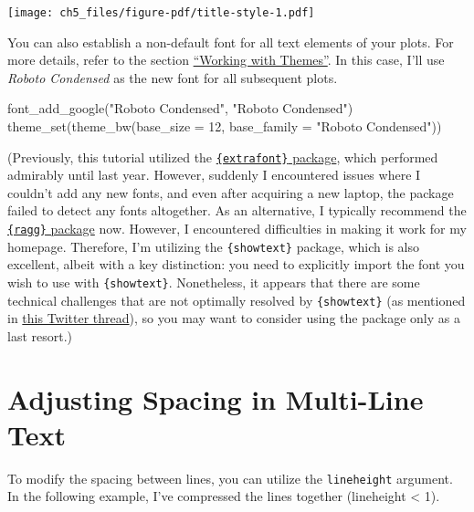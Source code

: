 \documentclass[
  letterpaper,
]{scrbook}
\newenvironment{Shaded}{\begin{snugshade}}{\end{snugshade}}
\newcommand{\AttributeTok}[1]{\textcolor[rgb]{0.40,0.45,0.13}{#1}}
\newcommand{\DecValTok}[1]{\textcolor[rgb]{0.68,0.00,0.00}{#1}}
\newcommand{\FunctionTok}[1]{\textcolor[rgb]{0.28,0.35,0.67}{#1}}
\newcommand{\NormalTok}[1]{\textcolor[rgb]{0.00,0.23,0.31}{#1}}
\newcommand{\StringTok}[1]{\textcolor[rgb]{0.13,0.47,0.30}{#1}}
\begin{document}
\texttt{[image: ch5\_files/figure-pdf/title-style-1.pdf]}

You can also establish a non-default font for all text elements of your
plots. For more details, refer to the section
\hyperref[themes]{``Working with Themes''}. In this case, I'll use
\emph{Roboto Condensed} as the new font for all subsequent plots.

\begin{Shaded}
\begin{Highlighting}[]
\FunctionTok{font\_add\_google}\NormalTok{(}\StringTok{"Roboto Condensed"}\NormalTok{, }\StringTok{"Roboto Condensed"}\NormalTok{)}
\FunctionTok{theme\_set}\NormalTok{(}\FunctionTok{theme\_bw}\NormalTok{(}\AttributeTok{base\_size =} \DecValTok{12}\NormalTok{, }\AttributeTok{base\_family =} \StringTok{"Roboto Condensed"}\NormalTok{))}
\end{Highlighting}
\end{Shaded}

(Previously, this tutorial utilized the
\href{https://cran.r-project.org/web/packages/extrafont/README.html}{\texttt{\{extrafont\}}
package}, which performed admirably until last year. However, suddenly I
encountered issues where I couldn't add any new fonts, and even after
acquiring a new laptop, the package failed to detect any fonts
altogether. As an alternative, I typically recommend the
\href{https://ragg.r-lib.org/}{\texttt{\{ragg\}} package} now. However,
I encountered difficulties in making it work for my homepage. Therefore,
I'm utilizing the \texttt{\{showtext\}} package, which is also
excellent, albeit with a key distinction: you need to explicitly import
the font you wish to use with \texttt{\{showtext\}}. Nonetheless, it
appears that there are some technical challenges that are not optimally
resolved by \texttt{\{showtext\}} (as mentioned in
\href{https://twitter.com/thomasp85/status/1355083725156077571}{this
Twitter thread}), so you may want to consider using the package only as
a last resort.)

\section{Adjusting Spacing in Multi-Line
Text}\label{adjusting-spacing-in-multi-line-text}

To modify the spacing between lines, you can utilize the
\texttt{lineheight} argument. In the following example, I've compressed
the lines together (lineheight \textless{} 1).
\end{document}
